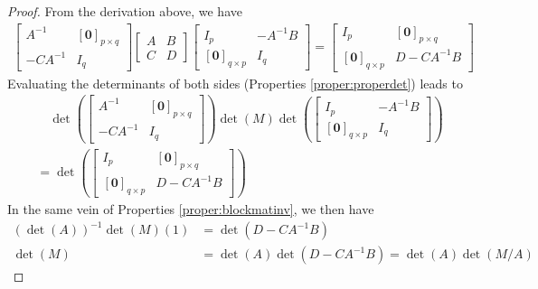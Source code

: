 \begin{proof}
From the derivation above, we have
\begin{align*}
\begin{bmatrix}
A^{-1} & [\textbf{0}]_{p\times q} \\
-CA^{-1} & I_q
\end{bmatrix}
\begin{bmatrix}
A & B \\
C & D
\end{bmatrix}
\begin{bmatrix}
I_p & -A^{-1}B \\
[\textbf{0}]_{q \times p} & I_q
\end{bmatrix} 
=
\begin{bmatrix}
I_p & [\textbf{0}]_{p \times q} \\
[\textbf{0}]_{q\times p} & D - CA^{-1}B 
\end{bmatrix}
\end{align*}
Evaluating the determinants of both sides (Properties \ref{proper:properdet}) leads to
\begin{align*}
&\quad \det(\begin{bmatrix}
A^{-1} & [\textbf{0}]_{p\times q} \\
-CA^{-1} & I_q
\end{bmatrix})
\det(M)
\det(\begin{bmatrix}
I_p & -A^{-1}B \\
[\textbf{0}]_{q \times p} & I_q
\end{bmatrix}) \\
&=
\det(\begin{bmatrix}
I_p & [\textbf{0}]_{p \times q} \\
[\textbf{0}]_{q\times p} & D - CA^{-1}B 
\end{bmatrix})
\end{align*}
In the same vein of Properties \ref{proper:blockmatinv}, we then have
\begin{align*}
(\det(A))^{-1}\det(M)(1) &= \det(D-CA^{-1}B) \\
\det(M) &= \det(A)\det(D-CA^{-1}B) = \det(A)\det(M/A)
\end{align*}
\end{proof}

